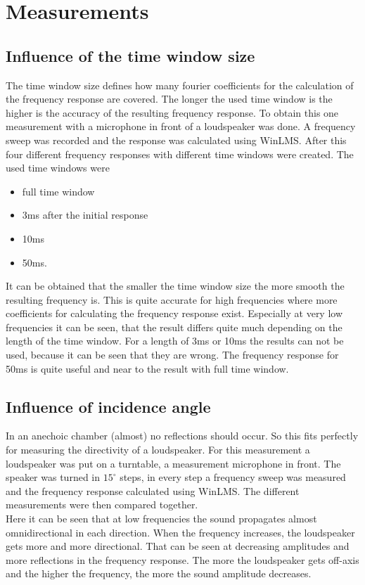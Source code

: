 \documentclass{article}
\begin{document}
\section{Measurements}
\subsection{Influence of the time window size}
The time window size defines how many fourier coefficients for the calculation of the frequency response are covered. The longer the used time window is the higher is the accuracy of the resulting frequency response. To obtain this one measurement with a microphone in front of a loudspeaker was done. A frequency sweep was recorded and the response was calculated using WinLMS. After this four different frequency responses with different time windows were created. The used time windows were 
\begin{itemize}
\item full time window
\item 3ms after the initial response
\item 10ms 
\item 50ms.
\end{itemize}
It can be obtained that the smaller the time window size the more smooth the resulting frequency is. This is quite accurate for high frequencies where more coefficients for calculating the frequency response exist. Especially at very low frequencies it can be seen, that the result differs quite much depending on the length of the time window. For a length of 3ms or 10ms the results can not be used, because it can be seen that they are wrong. The frequency response for 50ms is quite useful and near to the result with full time window.
\subsection{Influence of incidence angle}
In an anechoic chamber (almost) no reflections should occur. So this fits perfectly for measuring the directivity of a loudspeaker. For this measurement a loudspeaker was put on a turntable, a measurement microphone in front. The speaker was turned in $15^\circ$ steps, in every step a frequency sweep was measured and the frequency response calculated using WinLMS. The different measurements were then compared together.\\
Here it can be seen that at low frequencies the sound propagates almost omnidirectional in each direction. When the frequency increases, the loudspeaker gets more and more directional. That can be seen at decreasing amplitudes and more reflections in the frequency response. The more the loudspeaker gets off-axis and the higher the frequency, the more the sound amplitude decreases.
\end{document}
